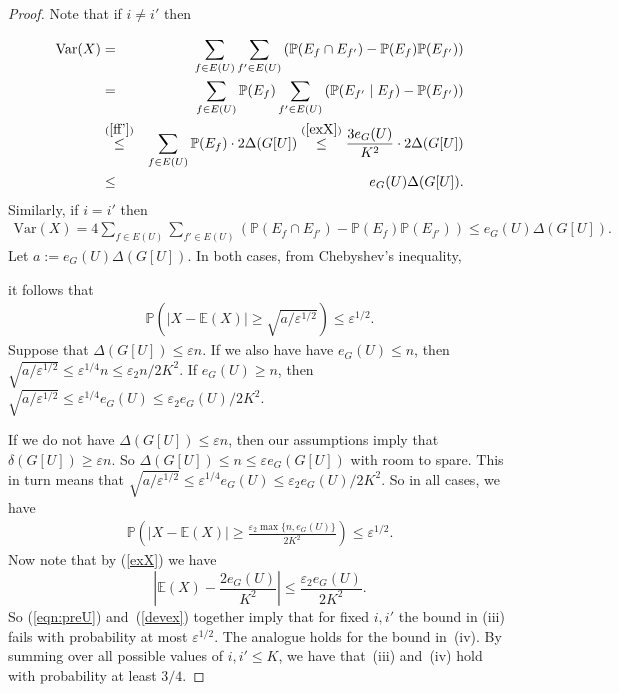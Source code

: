 \documentclass{memo-l}
\def\COMMENT#1{}
\def\eps{\varepsilon}
\def\ex{\mathbb{E}}
\def\pr{\mathbb{P}}
\numberwithin{section}{chapter}
\numberwithin{equation}{section}
\numberwithin{firstthm}{section}
\numberwithin{figure}{section}
\begin{document}
\begin{proof}
Note that if $i\neq i'$ then%
   \COMMENT{To see the first inequality note that by (\ref{ff'}) we have $\pr(E_{f'} \mid E_f ) -   \pr ( E_{f'} )\le 0$ if $f$ and
$f'$ are disjoint. But there are at most $2 \Delta (G[U])$ edges $f$ which share an endvertex with $f'$ (this includes the
case $f=f'$) and each of these edges $f$ contributes at most 1.}
\begin{eqnarray*}
\textrm{Var} ( X ) 
    & = & \sum_{f \in E(U)}  \sum_{f' \in E(U)}\left(\pr ( E_f \cap E_{f'} )  -   \pr ( E_f ) \pr ( E_{f'} )\right) \\
                & = & \sum_{f \in E(U)} \pr ( E_f ) \sum_{f' \in E(U)}  \left( \pr ( E_{f'} \mid E_f )  -    \pr ( E_{f'} ) \right) \\  
                & \stackrel{(\ref{ff'})}{\le} & \sum_{f \in E(U)} \pr ( E_f )\cdot 2 \Delta (G[U])  
 \stackrel{(\ref{exX})}{\le} \frac{3e_G(U)}{K^2}  \cdot 2\Delta (G[U]) \\
     & \le & e_G(U)  \Delta (G[U]).
\end{eqnarray*}
Similarly, if $i=i'$ then
\begin{eqnarray*}
\textrm{Var} ( X ) 
     =  4\sum_{f \in E(U)}  \sum_{f' \in E(U)}\left(\pr ( E_f \cap E_{f'} )  -   \pr ( E_f ) \pr ( E_{f'} ) \right)
                \le e_G(U)  \Delta (G[U]).
\end{eqnarray*}
Let $a:= e_G(U)  \Delta (G[U])$. In both cases, from Chebyshev's inequality,%
   \COMMENT{$\pr \left( | X- \ex(X) |  \ge b  \right) \le Var(X)/b^2$}
it follows that
\begin{align}
\pr \left( | X- \ex(X) |  \ge \sqrt{ a/\eps^{1/2} } \right) \le \eps^{1/2}.  \nonumber
\end{align}
Suppose that $\Delta (G[U]) \le \eps n$.
If we also have have $e_G(U) \le  n$, then 
$\sqrt{ a/\eps^{1/2} } \le   \eps^{1/4}  n \le \eps_2n/2K^2$.
If $e_G(U) \ge n$, then $\sqrt{ a/ \eps^{1/2} } \le \eps^{1/4 }e_G(U) \le \eps_2 e_G(U)/2K^2$.
 
 
If we do not have $\Delta (G[U]) \le \eps n$, then our assumptions imply that $\delta (G[U]) \ge \eps n$.
So $\Delta(G[U]) \le n \le \eps e_G(G[U])$ with room to spare.
This in turn means that $\sqrt{ a/ \eps^{1/2} } \le \eps^{1/4} e_G(U) \le \eps_2 e_G(U)/2K^2$.
So in all cases, we have 
\begin{align}
                \pr \left(  \left| X - \ex(X) \right| \ge  \frac{\eps  _2 \max \{ n, e_G(U)\} }{2K^2}\right) \le \eps^{1/2}. \label{eqn:preU}
\end{align}
Now note that by (\ref{exX}) we have
\begin{equation} \label{devex}
\left| \ex(X)- \frac{2e_G(U)}{K^2} \right| \le \frac{\eps  _2 e_G(U) }{2K^2}.
\end{equation}
So (\ref{eqn:preU}) and~(\ref{devex}) together imply that for fixed $i,i'$ the bound in (iii) fails with probability
at most $\eps^{1/2}$. The analogue holds for the bound in~(iv).
By summing over all possible values of $i,i' \le K$, we have that~(iii) and~(iv) hold with probability at least $3/4$.
 

\end{proof}
\end{document}
